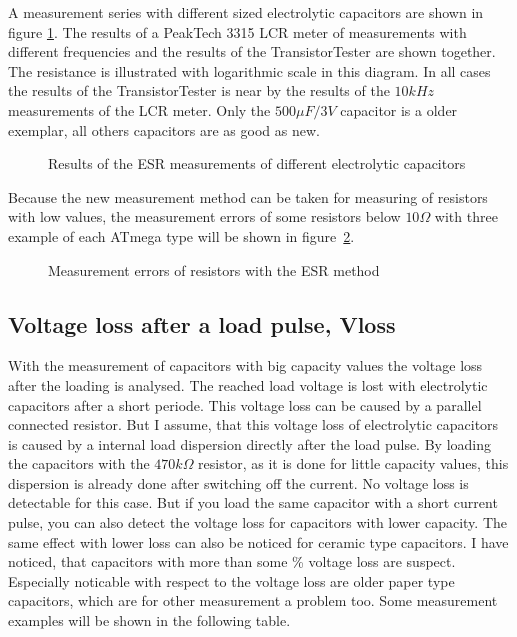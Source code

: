 A measurement series with different sized electrolytic capacitors are shown in figure \ref{fig:ElcoESR}.
The results of a PeakTech 3315 LCR meter of measurements with different frequencies and the results of the
TransistorTester are shown together. The resistance is illustrated with logarithmic scale in this diagram. 
In all cases the results of the TransistorTester is near by the results of
the \(10 kHz\) measurements of the LCR meter.
Only the \(500 \mu F/3V\) capacitor is a older exemplar, all others capacitors are as good as new.

\begin{figure}[H]
\centering

\caption{Results of the ESR measurements of different electrolytic capacitors}
\label{fig:ElcoESR}
\end{figure}


Because the new measurement method can be taken for measuring of resistors with low values, the
measurement errors of some resistors below \(10 \Omega\) with three example of each ATmega type will be shown in
figure~\ref{fig:res_esr}. 

\begin{figure}[H]
\centering

\caption{Measurement errors of resistors with the ESR method}
\label{fig:res_esr}
\end{figure}




\subsection{Voltage loss after a load pulse, Vloss}
With the measurement of capacitors with big capacity values the voltage loss after the loading is analysed.
The reached load voltage is lost with electrolytic capacitors after a short periode.
This voltage loss can be caused by a parallel connected resistor.
But I assume, that this voltage loss of electrolytic capacitors is caused by a internal load dispersion directly
after the load pulse. By loading the capacitors with the \(470 k\Omega\) resistor, as it is done for little
capacity values, this dispersion is already done after switching off the current.
No voltage loss is detectable for this case. But if you load the same capacitor with a short current pulse,
you can also detect the voltage loss for capacitors with lower capacity.
The same effect with lower loss can also be noticed for ceramic type capacitors. 
I have noticed, that capacitors with more than some \% voltage loss are suspect.
Especially noticable with respect to the voltage loss are older paper type capacitors, which are for other measurement
a problem too. Some measurement examples will be shown in the following table.
\vspace{0.5 cm}

